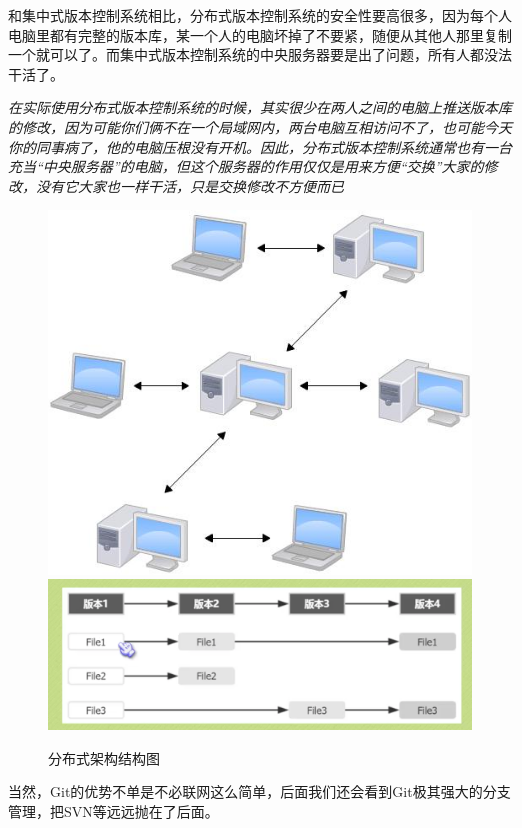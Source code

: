 \documentclass[UTF8,a4paper,12pt]{ctexbook}
\begin{document}
		  和集中式版本控制系统相比，分布式版本控制系统的安全性要高很多，因为每个人电脑里都有完整的版本库，某一个人的电脑坏掉了不要紧，随便从其他人那里复制一个就可以了。而集中式版本控制系统的中央服务器要是出了问题，所有人都没法干活了。
		  
		  \textit{在实际使用分布式版本控制系统的时候，其实很少在两人之间的电脑上推送版本库的修改，因为可能你们俩不在一个局域网内，两台电脑互相访问不了，也可能今天你的同事病了，他的电脑压根没有开机。因此，分布式版本控制系统通常也有一台充当“中央服务器”的电脑，但这个服务器的作用仅仅是用来方便“交换”大家的修改，没有它大家也一样干活，只是交换修改不方便而已}
		  
		  \begin{figure}[h]
		  	\centering
		  	\includegraphics[scale = 0.7]{FenBuShi.jpg}
		  	\includegraphics[scale = 0.7]{figure/git.png}
		  	\caption{分布式架构结构图}
		  \end{figure}
		  
		 当然，Git的优势不单是不必联网这么简单，后面我们还会看到Git极其强大的分支管理，把SVN等远远抛在了后面。
  
\end{document}

